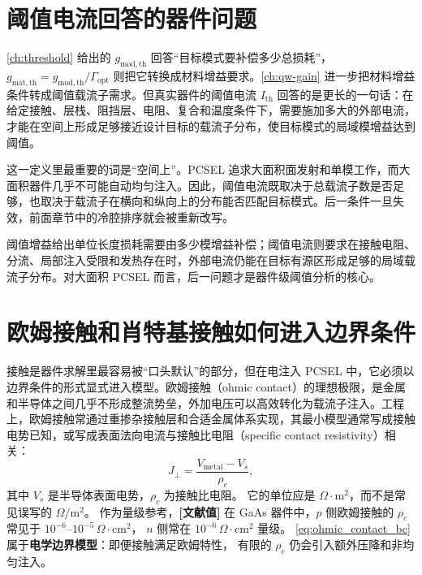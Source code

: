 \section{阈值电流回答的器件问题}
\cref{ch:threshold} 给出的 $g_{\mathrm{mod,th}}$ 回答“目标模式要补偿多少总损耗”，$g_{\mathrm{mat,th}}=g_{\mathrm{mod,th}}/\Gamma_{\mathrm{opt}}$ 则把它转换成材料增益要求。\cref{ch:qw-gain} 进一步把材料增益条件转成阈值载流子需求。但真实器件的阈值电流 $I_{\mathrm{th}}$ 回答的是更长的一句话：在给定接触、层栈、阻挡层、电阻、复合和温度条件下，需要施加多大的外部电流，才能在空间上形成足够接近设计目标的载流子分布，使目标模式的局域模增益达到阈值。

这一定义里最重要的词是“空间上”。PCSEL 追求大面积面发射和单模工作，而大面积器件几乎不可能自动均匀注入。因此，阈值电流既取决于总载流子数是否足够，也取决于载流子在横向和纵向上的分布能否匹配目标模式。后一条件一旦失效，前面章节中的冷腔排序就会被重新改写。

\begin{IntuitionBox}
阈值增益给出单位长度损耗需要由多少模增益补偿；阈值电流则要求在接触电阻、分流、局部注入受限和发热存在时，外部电流仍能在目标有源区形成足够的局域载流子分布。对大面积 PCSEL 而言，后一问题才是器件级阈值分析的核心。
\end{IntuitionBox}

\section{欧姆接触和肖特基接触如何进入边界条件}
接触是器件求解里最容易被“口头默认”的部分，但在电注入 PCSEL 中，它必须以边界条件的形式显式进入模型。欧姆接触（ohmic contact）的理想极限，是金属和半导体之间几乎不形成整流势垒，外加电压可以高效转化为载流子注入。工程上，欧姆接触常通过重掺杂接触层和合适金属体系实现，其最小模型通常写成接触电势已知，或写成表面法向电流与接触比电阻（specific contact resistivity）相关：
\begin{equation}
J_\perp = \frac{V_{\mathrm{metal}}-V_s}{\rho_c},
\label{eq:ohmic_contact_bc}
\end{equation}
其中 $V_s$ 是半导体表面电势，$\rho_c$ 为接触比电阻。
它的单位应是 $\Omega\cdot\mathrm{m}^2$，而不是常见误写的 $\Omega/\mathrm{m}^2$。
作为量级参考，\textbf{[文献值]} 在 GaAs 器件中，$p$ 侧欧姆接触的 $\rho_c$
常见于 $10^{-6}$--$10^{-5}\,\Omega\cdot\mathrm{cm}^2$，
$n$ 侧常在 $10^{-6}\,\Omega\cdot\mathrm{cm}^2$ 量级\cite{coldren2012}。
\cref{eq:ohmic_contact_bc} 属于\textbf{电学边界模型}：即便接触满足欧姆特性，
有限的 $\rho_c$ 仍会引入额外压降和非均匀注入。

